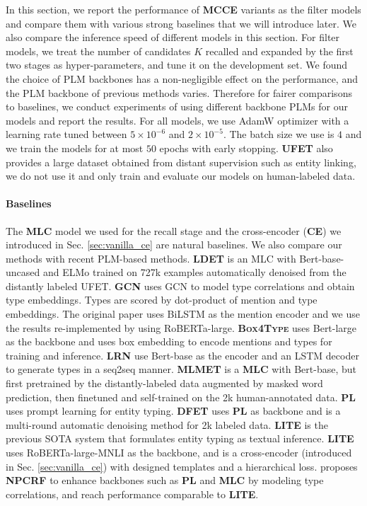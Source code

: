 In this section, we report the performance of {\bf \textsc{MCCE}} variants as the filter models and compare them with various strong baselines that we will introduce later. We also compare the inference speed of different models in this section. For filter models, we treat the number of candidates $K$ recalled and expanded by the first two stages as hyper-parameters, and tune it on the development set. We found the choice of PLM backbones has a non-negligible effect on the performance, and the PLM backbone of previous methods varies. Therefore for fairer comparisons to baselines, we conduct experiments of {\bf \textsc{\name}} using different backbone PLMs for our {\bf \textsc{\name}} models and report the results. For all {\bf \textsc{\name}} models, we use AdamW optimizer with a learning rate tuned between $5\times 10^{-6}$ and $2\times 10^{-5}$. The batch size we use is $4$ and we train the models for at most $50$ epochs with early stopping. {\bf \textsc{UFET}} also provides a large dataset obtained from distant supervision such as entity linking, we do not use it and only train and evaluate our models on human-labeled data.
\paragraph{Baselines}
The {\bf \textsc{MLC}} model we used for the recall stage and the cross-encoder ({\bf \textsc{CE}}) we introduced in Sec. \ref{sec:vanilla_ce} are natural baselines. We also compare our methods with recent PLM-based methods. {\bf \textsc{LDET} }\cite{onoe-durrett-2019-learning} is an MLC with Bert-base-uncased and ELMo \cite{elmo} trained on 727k examples automatically denoised from the distantly labeled UFET. {\bf \textsc{GCN} }\cite{xiong-etal-2019-imposing} uses GCN to model type correlations and obtain type embeddings. Types are scored by dot-product of mention and type embeddings. The original paper uses BiLSTM as the mention encoder and we use the results re-implemented by \citet{npcrf} using RoBERTa-large. {\bf \textsc{Box4Type} }\cite{box4types} uses Bert-large as the backbone and uses box embedding to encode mentions and types for training and inference. {\bf \textsc{LRN} }\cite{liu-etal-2021-fine} use Bert-base as the encoder and an LSTM decoder to generate types in a seq2seq manner. {\bf \textsc{MLMET} }\cite{mlmet} is a {\bf \textsc{MLC}} with Bert-base, but first pretrained by the distantly-labeled data augmented by masked word prediction, then finetuned and self-trained on the 2k human-annotated data. {\bf \textsc{PL}} \cite{ding2021prompt} uses prompt learning for entity typing. {\bf \textsc{DFET} }\cite{dfet} uses {\bf \textsc{PL}} as backbone and is a multi-round automatic denoising method for 2k labeled data. {\bf \textsc{LITE} }\cite{lite} is the previous SOTA system that formulates entity typing as textual inference. {\bf \textsc{LITE}} uses RoBERTa-large-MNLI as the backbone, and is a cross-encoder (introduced in Sec. \ref{sec:vanilla_ce}) with designed templates and a hierarchical loss. \citet{npcrf} proposes {\bf \textsc{NPCRF}} to enhance backbones such as {\bf \textsc{PL}} and {\bf \textsc{MLC}} by modeling type correlations, and reach performance comparable to {\bf \textsc{LITE}}.

